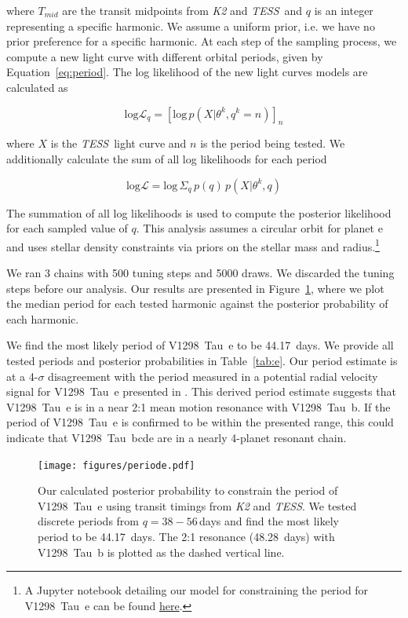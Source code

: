 \documentclass[linenumbers,twocolumn]{aastex631}
\newcommand{\githubicon}{{\color{black}\faGithub}}
\newcommand{\tess}{\textit{TESS}}
\newcommand{\allplanets}{V1298~Tau~bcde\xspace}
\newcommand{\planetb}{V1298~Tau~b\xspace}
\newcommand{\planete}{V1298~Tau~e\xspace}
\begin{document}
where $T_{mid}$ are the transit midpoints from \textit{K2} and \tess\ and $q$ is an integer representing a specific harmonic. We assume a uniform prior, i.e. we have no prior preference for a specific harmonic. At each step of the sampling process, we compute a new light curve with different orbital periods, given by Equation~\ref{eq:period}. The log likelihood of the new light curves models are calculated as

\begin{equation}
    \textrm{log} \mathcal{L}_q = \left[ \textrm{log}\, p \left( X | \theta^k, q^k = n \right) \right]_n
\end{equation}

where $X$ is the \tess\ light curve and $n$ is the period being tested. We additionally calculate the sum of all log likelihoods for each period 

\begin{equation}
    \textrm{log} \mathcal{L} = \textrm{log}\, \Sigma_q\, p(q)\, p(X|\theta^k, q) 
\end{equation}

The summation of all log likelihoods is used to compute the posterior likelihood for each sampled value of $q$. This analysis assumes a circular orbit for planet e and uses stellar density constraints via priors on the stellar mass and radius.\footnote{A Jupyter notebook detailing our model for constraining the period for \planete can be found \href{https://github.com/afeinstein20/v1298tau\_tess/blob/main/notebooks/V1298Tau\_e.ipynb}{here}.}

We ran 3 chains with 500 tuning steps and 5000 draws. We discarded the tuning steps before our analysis. Our results are presented in Figure~\ref{fig:period_e}, where we plot the median period for each tested harmonic against the posterior probability of each harmonic.

We find the most likely period of \planete to be 44.17~days. We provide all tested periods and posterior probabilities in Table~\ref{tab:e}. Our period estimate is at a 4-$\sigma$ disagreement with the period measured in a potential radial velocity signal for \planete presented in \cite{suarez21}. This derived period estimate suggests that \planete is in a near 2:1 mean motion resonance with \planetb. If the period of \planete is confirmed to be within the presented range, this could indicate that \allplanets are in a nearly 4-planet resonant chain.

\begin{figure}[h]
\begin{center}
\texttt{[image: figures/periode.pdf]}
\caption{Our calculated posterior probability to constrain the period of \planete using transit timings from \textit{K2} and \tess. We tested discrete periods from $q=38-56$\,days and find the most likely period to be 44.17~days. The 2:1 resonance (48.28~days) with \planetb is plotted as the dashed vertical line. \href{https://github.com/afeinstein20/v1298tau\_tess/blob/main/src/figures/period\_e.py}{\githubicon}} \label{fig:period_e}
\end{center}
\end{figure}
\end{document}
